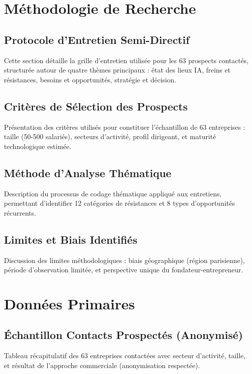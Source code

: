 \documentclass[12pt,a4paper]{report}
\begin{document}
\printbibliography[title=Bibliographie]

\appendix

\chapter{Méthodologie de Recherche}
\label{app:methodologie}

\section{Protocole d'Entretien Semi-Directif}
Cette section détaille la grille d'entretien utilisée pour les 63 prospects contactés, structurée autour de quatre thèmes principaux : état des lieux IA, freins et résistances, besoins et opportunités, stratégie et décision.

\section{Critères de Sélection des Prospects}
Présentation des critères utilisés pour constituer l'échantillon de 63 entreprises : taille (50-500 salariés), secteurs d'activité, profil dirigeant, et maturité technologique estimée.

\section{Méthode d'Analyse Thématique}
Description du processus de codage thématique appliqué aux entretiens, permettant d'identifier 12 catégories de résistances et 8 types d'opportunités récurrents.

\section{Limites et Biais Identifiés}
Discussion des limites méthodologiques : biais géographique (région parisienne), période d'observation limitée, et perspective unique du fondateur-entrepreneur.

\chapter{Données Primaires}
\label{app:donnees}

\section{Échantillon Contacts Prospectés (Anonymisé)}
Tableau récapitulatif des 63 entreprises contactées avec secteur d'activité, taille, et résultat de l'approche commerciale (anonymisation respectée).
\end{document}
